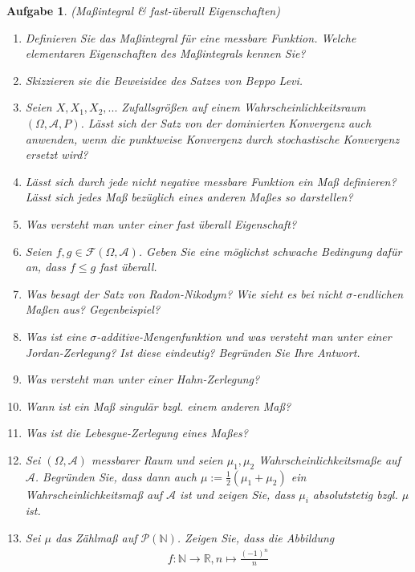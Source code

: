 \documentclass[11pt, a4paper, ngerman]{article}
\newcommand{\N}{\mathbb{N}}
\newcommand{\R}{\mathbb{R}}
\newtheorem{aufgabe}{Aufgabe}
\begin{document}
\begin{aufgabe} (Maßintegral \& fast-überall Eigenschaften)
    \begin{enumerate}
        \item 
        Definieren Sie das Maßintegral für eine messbare Funktion. Welche elementaren Eigenschaften des Maßintegrals kennen Sie?  
        \item
        Skizzieren sie die Beweisidee des Satzes von Beppo Levi. 
        \item 
        Seien $X, X_1, X_2,...$ Zufallsgrößen auf einem Wahrscheinlichkeitsraum $(\Omega, \mathcal{A},P)$. Lässt sich der Satz von der dominierten Konvergenz auch anwenden, wenn die punktweise Konvergenz durch stochastische Konvergenz ersetzt wird? 
        \item 
        Lässt sich durch jede nicht negative messbare Funktion ein Maß definieren? Lässt sich jedes Maß bezüglich eines anderen Maßes so darstellen?
        \item 
        Was versteht man unter einer fast überall Eigenschaft?
        \item 
        Seien $f,g \in \mathcal{F}(\Omega, \mathcal{A})$. Geben Sie eine möglichst schwache Bedingung dafür an, dass $f \leq g$ fast überall.
        \item 
        Was besagt der Satz von Radon-Nikodym? Wie sieht es bei nicht $\sigma$-endlichen Maßen aus? Gegenbeispiel?
        \item 
        Was ist eine $\sigma$-additive-Mengenfunktion und was versteht man unter einer Jordan-Zerlegung? Ist diese eindeutig? Begründen Sie Ihre Antwort. 
        \item 
        Was versteht man unter einer Hahn-Zerlegung?
        \item 
        Wann ist ein Maß singulär bzgl. einem anderen Maß? 
        \item 
        Was ist die Lebesgue-Zerlegung eines Maßes?
        \item 
        Sei $(\Omega, \mathcal{A})$ messbarer Raum und seien $\mu_1, \mu_2$ Wahrscheinlichkeitsmaße auf $\mathcal{A}$. Begründen Sie, dass dann auch $\mu := \frac{1}{2}(\mu_1 + \mu_2)$
        ein Wahrscheinlichkeitsmaß auf $\mathcal{A}$ ist und zeigen Sie, dass $\mu_i$ absolutstetig bzgl. $\mu$ ist. 
        \item 
        Sei $\mu$ das Zählmaß auf $\mathcal{P}(\N)$. Zeigen Sie, dass die Abbildung
        \begin{align*}
            f: \N \to \R, n \mapsto \frac{(-1)^n}{n}

\end{align*}
\end{enumerate}
\end{aufgabe}
\end{document}

